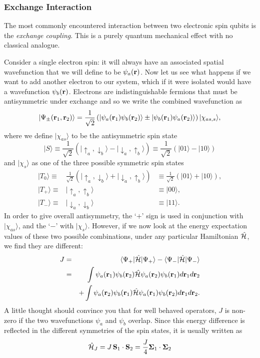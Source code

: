 \documentclass[a4paper,11pt]{article}
\newcommand{\ket}[1]{| #1 \rangle}
\newcommand{\bra}[1]{\langle #1 |}
\newcommand{\beq}{\begin{equation}}
\newcommand{\eeq}{\end{equation}}
\newcommand{\baq}{\begin{eqnarray}}
\newcommand{\eaq}{\end{eqnarray}}
\begin{document}
\subsubsection{Exchange Interaction}

The most commonly encountered interaction between two electronic spin qubits is the {\it exchange coupling}. This is a purely quantum mechanical effect with no classical analogue.

Consider a single electron spin: it will always have an associated spatial wavefunction that we will define to be $\psi_a (\bf r)$. Now let us see what happens if we want to add another electron to our system, which if it were isolated would have a wavefunction $\psi_b(\bf r)$. Electrons are indistinguishable fermions that must be antisymmetric under exchange and so we write the combined wavefunction as
\beq
\ket{\Psi_\pm({\bf r}_1, {\bf r}_2)} = \frac{1}{\sqrt{2}} \left(\ket{\psi_a({\bf r}_1)\psi_b({\bf r}_2)}\pm \ket{\psi_b({\bf r}_1)\psi_a({\bf r}_2)}\right)\ket{\chi_{as, s}},
\label{exchange}
\eeq
where we define
$\ket{\chi_{as}}$ to be the antisymmetric spin state 
\beq
\ket{S} \equiv \frac{1}{\sqrt{2}}(\ket{\uparrow_a, \downarrow_b}-\ket{\downarrow_a, \uparrow_b}) \equiv \frac{1}{\sqrt{2}}(\ket{01}-\ket{10})
\label{singlet}
\eeq 
and $\ket{\chi_s}$ as one of the three possible symmetric spin states
\baq
\ket{T_0} \equiv& \frac{1}{\sqrt{2}} (\ket{\uparrow_a, \downarrow_b}+\ket{\downarrow_a, \uparrow_b}) &\equiv \frac{1}{\sqrt{2}}(\ket{01}+\ket{10}),\nonumber\\
\ket{T_+} \equiv &\ket{\uparrow_a, \uparrow_b} &\equiv \ket{00},\nonumber\\
\ket{T_-} \equiv&\ket{\downarrow_a, \downarrow_b} &\equiv \ket{11}.
\label{triplets}
\eaq
In order to give overall antisymmetry, the `$+$' sign is used in conjunction with $\ket{\chi_{as}}$, and the `$-$' with $\ket{\chi_s}$. However, if we now look at the energy expectation values of these two possible combinations, under any particular Hamiltonian ${\cal \hat H}$, we find they are different:
\baq
J &=& \bra{\Psi_+} {\cal \hat H} \ket{\Psi_+} - \bra{\Psi_-} {\cal \hat H} \ket{\Psi_-}\nonumber\\
&=&  \int \psi_a({\bf r}_1)\psi_b({\bf r}_2){\cal\hat H}\psi_a({\bf r}_2)\psi_b({\bf r}_1) d{\bf r}_1 d{\bf r}_2 \nonumber\\
&&+  \int \psi_a({\bf r}_2)\psi_b({\bf r}_1){\cal\hat H}\psi_a({\bf r}_1)\psi_b({\bf r}_2) d{\bf r}_1 d{\bf r}_2 .
\eaq
A little thought should convince you that for well behaved operators, $J$ is non-zero if the two wavefunctions $\psi_a$ and $\psi_b$ overlap. Since this energy difference is reflected in the different symmetries of the spin states, it is usually written as
\beq
{\cal \hat H}_J = J \,{\bf S}_1 \cdot {\bf S}_2 = \frac{J}{4} {\bf \Sigma}_1 \cdot {\bf \Sigma}_2
\label{heisenberg}
\eeq
\end{document}
